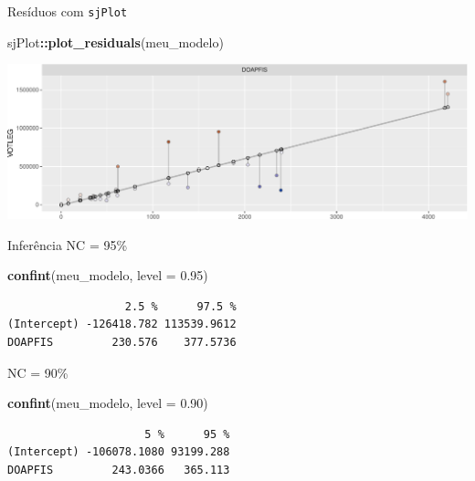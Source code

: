 \documentclass[
  9pt,
  ignorenonframetext,
  aspectratio=169]{beamer}
\newenvironment{Shaded}{\begin{snugshade}}{\end{snugshade}}
\newcommand{\DataTypeTok}[1]{\textcolor[rgb]{0.13,0.29,0.53}{#1}}
\newcommand{\FloatTok}[1]{\textcolor[rgb]{0.00,0.00,0.81}{#1}}
\newcommand{\KeywordTok}[1]{\textcolor[rgb]{0.13,0.29,0.53}{\textbf{#1}}}
\newcommand{\NormalTok}[1]{#1}
\newcommand{\OperatorTok}[1]{\textcolor[rgb]{0.81,0.36,0.00}{\textbf{#1}}}
\begin{document}
\begin{frame}[fragile]{Resíduos com \texttt{sjPlot}}
\protect\hypertarget{resuxedduos-com-sjplot-1}{}
\begin{Shaded}
\begin{Highlighting}[]
\NormalTok{sjPlot}\OperatorTok{::}\KeywordTok{plot\_residuals}\NormalTok{(meu\_modelo)}
\end{Highlighting}
\end{Shaded}

\includegraphics{aula_12_files/figure-beamer/unnamed-chunk-9-1.pdf}
\end{frame}

\begin{frame}[fragile]{Inferência}
\protect\hypertarget{inferuxeancia}{}
NC = 95\%

\begin{Shaded}
\begin{Highlighting}[]
\KeywordTok{confint}\NormalTok{(meu\_modelo, }\DataTypeTok{level =} \FloatTok{0.95}\NormalTok{)}
\end{Highlighting}
\end{Shaded}

\begin{verbatim}
                  2.5 %      97.5 %
(Intercept) -126418.782 113539.9612
DOAPFIS         230.576    377.5736
\end{verbatim}

NC = 90\%

\begin{Shaded}
\begin{Highlighting}[]
\KeywordTok{confint}\NormalTok{(meu\_modelo, }\DataTypeTok{level =} \FloatTok{0.90}\NormalTok{)}
\end{Highlighting}
\end{Shaded}

\begin{verbatim}
                     5 %      95 %
(Intercept) -106078.1080 93199.288
DOAPFIS         243.0366   365.113
\end{verbatim}
\end{frame}
\end{document}
